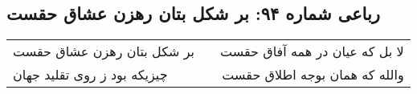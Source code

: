 \begin{center}
\section*{رباعی شماره ۹۴: بر شکل بتان رهزن عشاق حقست}
\label{sec:sh094}
\begin{longtable}{l p{0.5cm} r}
بر شکل بتان رهزن عشاق حقست
&&
لا بل که عیان در همه آفاق حقست
\\
چیزیکه بود ز روی تقلید جهان
&&
والله که همان بوجه اطلاق حقست
\\
\end{longtable}
\end{center}
